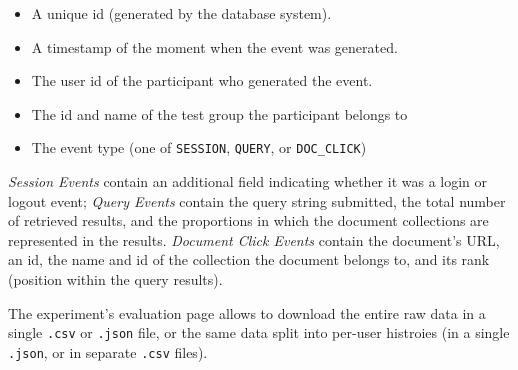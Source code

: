 \documentclass[a4paper]{usiinfbachelorproject}
\begin{document}
\begin{appendices}
        \begin{itemize}

        \item A unique id (generated by the database system).

        \item A timestamp of the moment when the event was generated.

        \item The user id of the participant who generated the event.

        \item The id and name of the test group the participant belongs to

        \item The event type (one of \texttt{SESSION}, \texttt{QUERY}, or \texttt{DOC\_CLICK})

        \end{itemize}

        \emph{Session Events} contain an additional field indicating whether it was a login or logout event; 
        \emph{Query Events} contain the query string submitted, the total number of retrieved results, and the proportions
        in which the document collections are represented in the results.
        \emph{Document Click Events} contain the document's URL, an id, the name and id of the collection the document belongs to,
        and its rank (position within the query results). 

        The experiment's evaluation page allows to download the entire raw data in a single \texttt{.csv} or \texttt{.json} file, 
        or the same data split into per-user histroies (in a single \texttt{.json}, or in separate \texttt{.csv} files).



        \end{appendices}


\newpage
	


\end{document}
